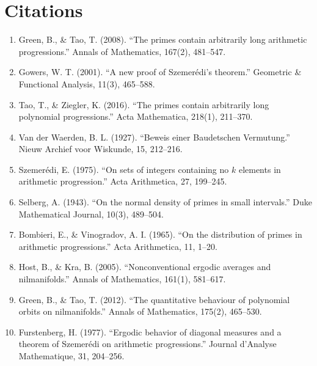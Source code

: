 \section{Citations}

\begin{enumerate}
\item Green, B., \& Tao, T. (2008). ``The primes contain arbitrarily long arithmetic progressions.'' Annals of Mathematics, 167(2), 481--547.
\item Gowers, W. T. (2001). ``A new proof of Szemer\'edi's theorem.'' Geometric \& Functional Analysis, 11(3), 465--588.
\item Tao, T., \& Ziegler, K. (2016). ``The primes contain arbitrarily long polynomial progressions.'' Acta Mathematica, 218(1), 211--370.
\item Van der Waerden, B. L. (1927). ``Beweis einer Baudetschen Vermutung.'' Nieuw Archief voor Wiskunde, 15, 212--216.
\item Szemer\'edi, E. (1975). ``On sets of integers containing no $k$ elements in arithmetic progression.'' Acta Arithmetica, 27, 199--245.
\item Selberg, A. (1943). ``On the normal density of primes in small intervals.'' Duke Mathematical Journal, 10(3), 489--504.
\item Bombieri, E., \& Vinogradov, A. I. (1965). ``On the distribution of primes in arithmetic progressions.'' Acta Arithmetica, 11, 1--20.
\item Host, B., \& Kra, B. (2005). ``Nonconventional ergodic averages and nilmanifolds.'' Annals of Mathematics, 161(1), 581--617.
\item Green, B., \& Tao, T. (2012). ``The quantitative behaviour of polynomial orbits on nilmanifolds.'' Annals of Mathematics, 175(2), 465--530.
\item Furstenberg, H. (1977). ``Ergodic behavior of diagonal measures and a theorem of Szemer\'edi on arithmetic progressions.'' Journal d'Analyse Mathematique, 31, 204--256.
\end{enumerate}
